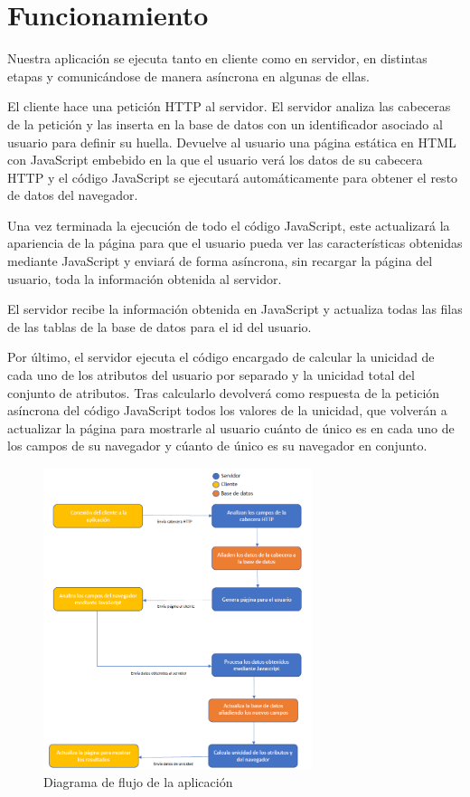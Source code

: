\section{Funcionamiento}
Nuestra aplicación se ejecuta tanto en cliente como en servidor, en distintas etapas y comunicándose de manera asíncrona en algunas de ellas. \par
El cliente hace una petición HTTP al servidor. El servidor analiza las cabeceras de la petición y las inserta en la base de datos con un identificador asociado al usuario para definir su huella. Devuelve al usuario una página estática en HTML con JavaScript embebido en la que el usuario verá los datos de su cabecera HTTP y el código JavaScript se ejecutará automáticamente para obtener el resto de datos del navegador. \par
Una vez terminada la ejecución de todo el código JavaScript, este actualizará la apariencia de la página para que el usuario pueda ver las características obtenidas mediante JavaScript y enviará de forma asíncrona, sin recargar la página del usuario, toda la información obtenida al servidor. \par
El servidor recibe la información obtenida en JavaScript y actualiza todas las filas de las tablas de la base de datos para el id del usuario. \par
Por último, el servidor ejecuta el código encargado de calcular la unicidad de cada uno de los atributos del usuario por separado y la unicidad total del conjunto de atributos. Tras calcularlo devolverá como respuesta de la petición asíncrona del código JavaScript todos los valores de la unicidad, que volverán a actualizar la página para mostrarle al usuario cuánto de único es en cada uno de los campos de su navegador y cúanto de único es su navegador en conjunto.
\begin{figure}[H]
    \centering
    \includegraphics[width=0.7\textwidth]{Images/diagrama flujo.png}
    \caption{Diagrama de flujo de la aplicación}
    \label{fig:diagramaFlujo}
\end{figure}
